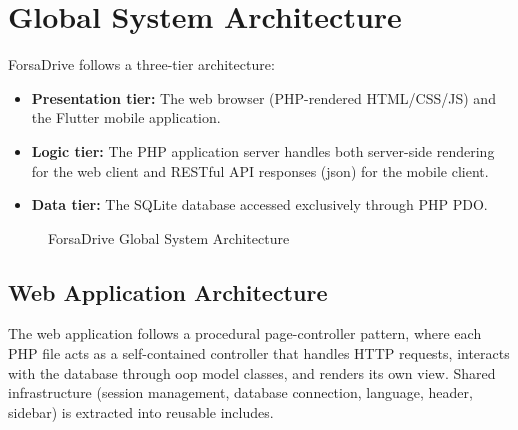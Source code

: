 \documentclass[12pt,a4paper,openright]{report}
\begin{document}
\section{Global System Architecture}

ForsaDrive follows a three-tier architecture:

\begin{itemize}[noitemsep]
    \item \textbf{Presentation tier:} The web browser (PHP-rendered HTML/CSS/JS) and the Flutter mobile application.
    \item \textbf{Logic tier:} The PHP application server handles both server-side rendering for the web client and RESTful API responses (\gls{json}) for the mobile client.
    \item \textbf{Data tier:} The SQLite database accessed exclusively through PHP PDO.
\end{itemize}

\begin{figure}[H]
\centering
{}
\caption{ForsaDrive Global System Architecture}
\label{fig:architecture}
\end{figure}

\subsection{Web Application Architecture}

The web application follows a procedural page-controller pattern, where each PHP file acts as a self-contained controller that handles HTTP requests, interacts with the database through \gls{oop} model classes, and renders its own view. Shared infrastructure (session management, database connection, language, header, sidebar) is extracted into reusable includes.
\end{document}
